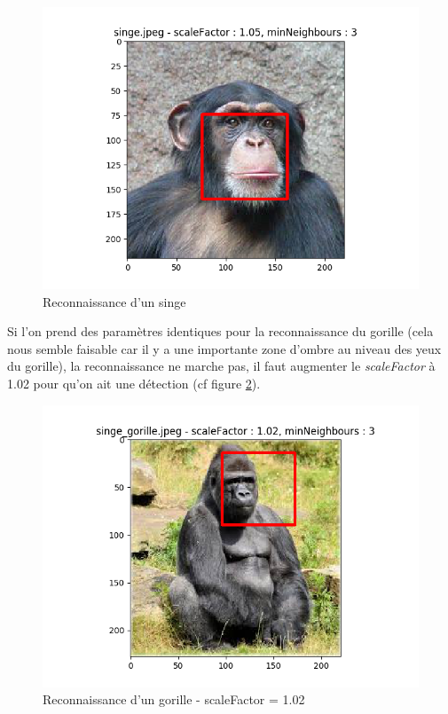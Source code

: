 \documentclass[a4paper,11pt]{article}
\begin{document}
	\begin{figure}[H]
	    \begin{center}
		\includegraphics[scale = 0.6]{images/singe_1,05_3.png}
		\caption{Reconnaissance d'un singe}
		\label{fig:singe}
	    \end{center}
	\end{figure}

	Si l'on prend des paramètres identiques pour la reconnaissance du gorille (cela nous semble
	faisable car il y a une importante zone d'ombre au niveau des yeux du gorille), la
	reconnaissance ne marche pas, il faut augmenter le \textit{scaleFactor} à 1.02 pour qu'on
	ait une détection (cf figure \ref{fig:singe2}).

	\begin{figure}[H]
	    \begin{center}
		\includegraphics[scale = 0.6]{images/singe_gorille_1,02_3.png}
		\caption{Reconnaissance d'un gorille - scaleFactor = 1.02}
		\label{fig:singe2}
	    \end{center}
	\end{figure}
\end{document}

